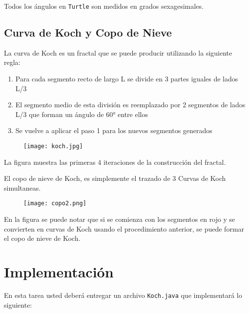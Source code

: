 \documentclass[dcc]{fcfmcourse}
\begin{document}
Todos los ángulos en \texttt{Turtle} son medidos en grados sexagesimales.

\subsection{Curva de Koch y Copo de Nieve}
La curva de Koch es un fractal que se puede producir utilizando la siguiente regla:

\vspace{-1ex}
\begin{enumerate}
    \item Para cada segmento recto de largo L se divide en 3 partes iguales de lados L/3
    \item El segmento medio de esta división es reemplazado por 2 segmentos de lados L/3 que forman un ángulo de 60° entre ellos
    \item Se vuelve a aplicar el paso 1 para los nuevos segmentos generados
\end{enumerate}

\vspace{-3ex}
\begin{figure}[h!]
    \centering
    \texttt{[image: koch.jpg]}
\end{figure}

La figura muestra las primeras 4 iteraciones de la construcción del fractal. 

\newpage
El copo de nieve de Koch, es simplemente el trazado de 3 Curvas de Koch simultaneas.

\begin{figure}[h!]
    \centering
    \texttt{[image: copo2.png]}
\end{figure}

En la figura se puede notar que si se comienza con los segmentos en rojo y se convierten en curvas de Koch usando el procedimiento anterior, se puede formar el copo de nieve de Koch.

\section{Implementación}

En esta tarea usted deberá entregar un archivo \texttt{Koch.java} que implementará lo siguiente:
\end{document}
